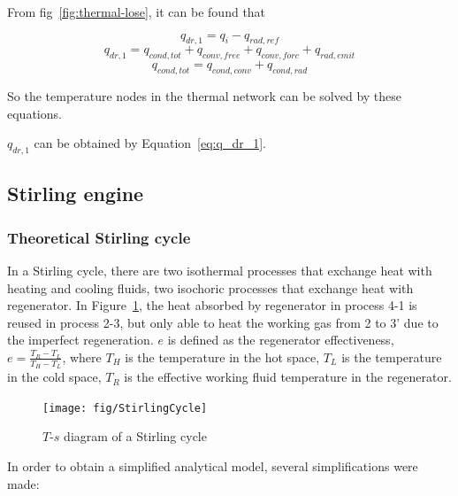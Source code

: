 From fig~\ref{fig:thermal-lose}, it can be found that

\begin{equation}
  q_{dr,1} = q_i - q_{rad,ref}
\end{equation}
\begin{equation}
  q_{dr,1} = q_{cond,tot} + q_{conv,free} + q_{conv,forc}+q_{rad,emit}
\end{equation}
\begin{equation}
  q_{cond,tot} = q_{cond,conv}+q_{cond,rad}
\end{equation}

So the temperature nodes in the thermal network can be solved by these equations.

$q_{dr,1}$ can be obtained by Equation~\ref{eq:q_dr_1}.

\subsection{Stirling engine}\label{sec:StirlingEngineModel}
\subsubsection{Theoretical Stirling cycle}
In a Stirling cycle, there are two isothermal processes that exchange heat with heating and cooling fluids, two isochoric processes that exchange heat with regenerator. In Figure~\ref{fig:StirlingCycle}, the heat absorbed by regenerator in process 4-1 is reused in process 2-3, but only able to heat the working gas from 2 to 3' due to the imperfect regeneration. $e$ is defined as the regenerator effectiveness\cite{Formosa2010,Juhasz2010}, $e=\frac{T_R-T_L}{T_H-T_L}$, where $T_H$ is the temperature in the hot space, $T_L$ is the temperature in the cold space, $T_R$ is the effective working fluid temperature in the regenerator.

\noindent \begin{figure}[htbp]
\begin{center}
	\texttt{[image: fig/StirlingCycle]}
	\caption{$T$-$s$ diagram of a Stirling cycle}
	\label{fig:StirlingCycle}
\end{center}
\end{figure}

In order to obtain a simplified analytical model, several simplifications were made:

